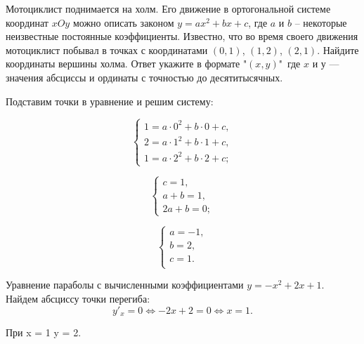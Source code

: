 
Мотоциклист поднимается на холм. Его движение в ортогональной системе координат $xOy$ можно описать законом $y = ax^2+bx+c$, где $a$ и $b$ -- некоторые неизвестные постоянные коэффициенты. Известно, что во время своего движения мотоциклист побывал в точках с координатами $(0,1)$, $(1,2)$, $(2,1)$. Найдите координаты вершины холма. Ответ укажите в формате "$(x, y)$"\, где $x$ и $у$ — значения абсциссы и ординаты с точностью до десятитысячных.

\solutionSection

Подставим точки в уравнение и решим систему:

\begin{equation*} 
    \begin{cases}
    1 = a\cdot 0^2 + b\cdot 0 + c,\\
    2 = a\cdot 1^2 + b\cdot 1 + c,\\
    1 = a\cdot 2^2 + b\cdot 2 + c;
    \end{cases}
\end{equation*}

\begin{equation*} 
    \begin{cases}
    c = 1,\\
    a + b = 1,\\
    2a + b = 0;
    \end{cases}
\end{equation*}

\begin{equation*} 
    \begin{cases}
        a = -1,\\
        b = 2, \\
        c = 1. \\
    \end{cases}
\end{equation*}

Уравнение параболы с вычисленными коэффициентами $y = -x^2 + 2x + 1$. Найдем абсциссу точки перегиба: 
$$y'_x=0 \Leftrightarrow -2x + 2 = 0 \Leftrightarrow x = 1. $$

При x = 1 y = 2.

